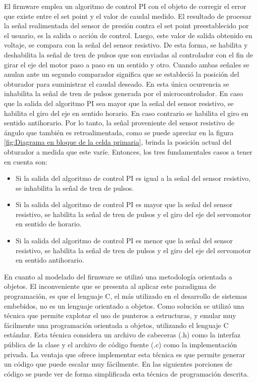 El firmware emplea un algoritmo de control PI con el objeto de corregir el error que existe entre el set point y el valor de caudal medido. El resultado de procesar la señal realimentada del sensor de presión contra el set point preestablecido por el usuario, es la salida o acción de control. Luego, este valor de salida obtenido en voltaje, se compara con la señal del sensor resistivo. De esta forma, se habilita y deshabilita la señal de tren de pulsos que son enviadas al controlador con el fin de girar el eje del motor paso a paso en un sentido y otro.
Cuando ambas señales se anulan ante un segundo comparador significa que  se estableció la posición del obturador para suministrar el caudal deseado. En esta única ocurrencia se inhabilita la señal de tren de pulsos generada por el microcontrolador. En caso que la salida del algoritmo PI sea mayor que la señal del sensor resistivo, se habilita el giro del eje en sentido horario. En caso contrario se habilita el giro en sentido antihorario.     
Por lo tanto, la señal proveniente del sensor resistivo de ángulo que también es retroalimentada, como se puede apreciar en la figura \ref{fig:Diagrama en bloque de la celda primaria}, brinda la posición actual del obturador a medida que este varíe. Entonces, los tres fundamentales casos a tener en cuenta son:
\begin{itemize}

\item Si la salida del algoritmo de control PI es igual a la señal del sensor resistivo, se inhabilita la señal de tren de pulsos.
\item Si la salida del algoritmo de control PI es mayor que la señal del sensor resistivo, se habilita la señal de tren de pulsos y el giro del eje del servomotor en sentido de horario.
\item Si la salida del algoritmo de control PI es menor que la señal del sensor resistivo, se habilita la señal de tren de pulsos y el giro del eje del servomotor en sentido antihorario.

\end{itemize}

En cuanto al modelado del firmware se utilizó una metodología orientada a objetos. El inconveniente que se presenta al aplicar este paradigma de programación, es que el lenguaje C, el más utilizado en el desarrollo de sistemas embebidos, no es un lenguaje orientado a objetos.
Como solución se utilizó una técnica que permite explotar el uso de punteros a estructuras, y emular muy fácilmente una programación orientada a objetos, utilizando el lenguaje C estándar\citep{ADT}. Esta técnica considera un archivo de cabeceras (.h) como la interfaz pública de la clase y el archivo de código fuente (.c) como la implementación privada.
La ventaja que ofrece implementar esta técnica es que permite generar un código que puede escalar muy fácilmente.
En las siguientes porciones de código se puede ver de forma simplificada esta técnica de programación descrita.



